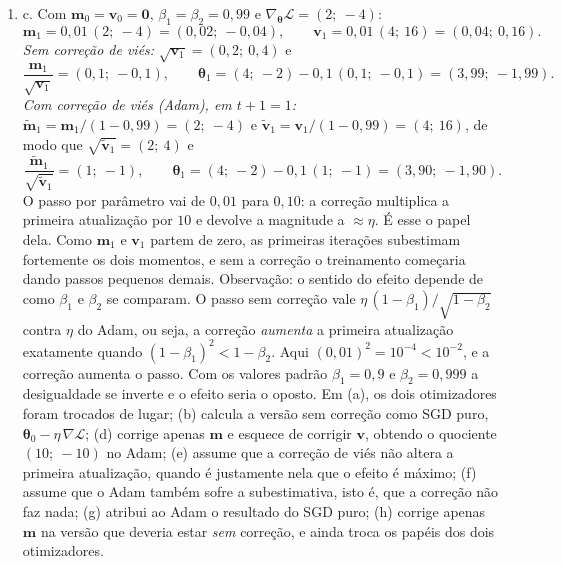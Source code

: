 \documentclass{dlproblemset}
\begin{document}
\begin{enumerate}[1)]
    \item c. Com $\mathbf{m}_0 = \mathbf{v}_0 = \mathbf{0}$, $\beta_1 = \beta_2 = 0{,}99$ e $\nabla_{\boldsymbol{\theta}}\mathcal{L} = (2;\ -4)$:
    \[
    \mathbf{m}_1 = 0{,}01\,(2;\ -4) = (0{,}02;\ -0{,}04),
    \qquad
    \mathbf{v}_1 = 0{,}01\,(4;\ 16) = (0{,}04;\ 0{,}16).
    \]
    \textit{Sem correção de viés:} $\sqrt{\mathbf{v}_1} = (0{,}2;\ 0{,}4)$ e
    \[
    \frac{\mathbf{m}_1}{\sqrt{\mathbf{v}_1}} = (0{,}1;\ -0{,}1),
    \qquad
    \boldsymbol{\theta}_1 = (4;\ -2) - 0{,}1\,(0{,}1;\ -0{,}1) = (3{,}99;\ -1{,}99).
    \]
    \textit{Com correção de viés (Adam), em $t + 1 = 1$:} $\widetilde{\mathbf{m}}_1 = \mathbf{m}_1/(1 - 0{,}99) = (2;\ -4)$ e $\widetilde{\mathbf{v}}_1 = \mathbf{v}_1/(1 - 0{,}99) = (4;\ 16)$, de modo que $\sqrt{\widetilde{\mathbf{v}}_1} = (2;\ 4)$ e
    \[
    \frac{\widetilde{\mathbf{m}}_1}{\sqrt{\widetilde{\mathbf{v}}_1}} = (1;\ -1),
    \qquad
    \boldsymbol{\theta}_1 = (4;\ -2) - 0{,}1\,(1;\ -1) = (3{,}90;\ -1{,}90).
    \]
    O passo por parâmetro vai de $0{,}01$ para $0{,}10$: a correção multiplica a primeira atualização por $10$ e devolve a magnitude a $\approx \eta$. É esse o papel dela. Como $\mathbf{m}_1$ e $\mathbf{v}_1$ partem de zero, as primeiras iterações subestimam fortemente os dois momentos, e sem a correção o treinamento começaria dando passos pequenos demais. Observação: o sentido do efeito depende de como $\beta_1$ e $\beta_2$ se comparam. O passo sem correção vale $\eta\,(1-\beta_1)/\sqrt{1-\beta_2}$ contra $\eta$ do Adam, ou seja, a correção \emph{aumenta} a primeira atualização exatamente quando $(1-\beta_1)^2 < 1-\beta_2$. Aqui $(0{,}01)^2 = 10^{-4} < 10^{-2}$, e a correção aumenta o passo. Com os valores padrão $\beta_1 = 0{,}9$ e $\beta_2 = 0{,}999$ a desigualdade se inverte e o efeito seria o oposto. Em (a), os dois otimizadores foram trocados de lugar; (b) calcula a versão sem correção como SGD puro, $\boldsymbol{\theta}_0 - \eta\,\nabla\mathcal{L}$; (d) corrige apenas $\mathbf{m}$ e esquece de corrigir $\mathbf{v}$, obtendo o quociente $(10;\ -10)$ no Adam; (e) assume que a correção de viés não altera a primeira atualização, quando é justamente nela que o efeito é máximo; (f) assume que o Adam também sofre a subestimativa, isto é, que a correção não faz nada; (g) atribui ao Adam o resultado do SGD puro; (h) corrige apenas $\mathbf{m}$ na versão que deveria estar \emph{sem} correção, e ainda troca os papéis dos dois otimizadores.


\end{enumerate}
\end{document}
